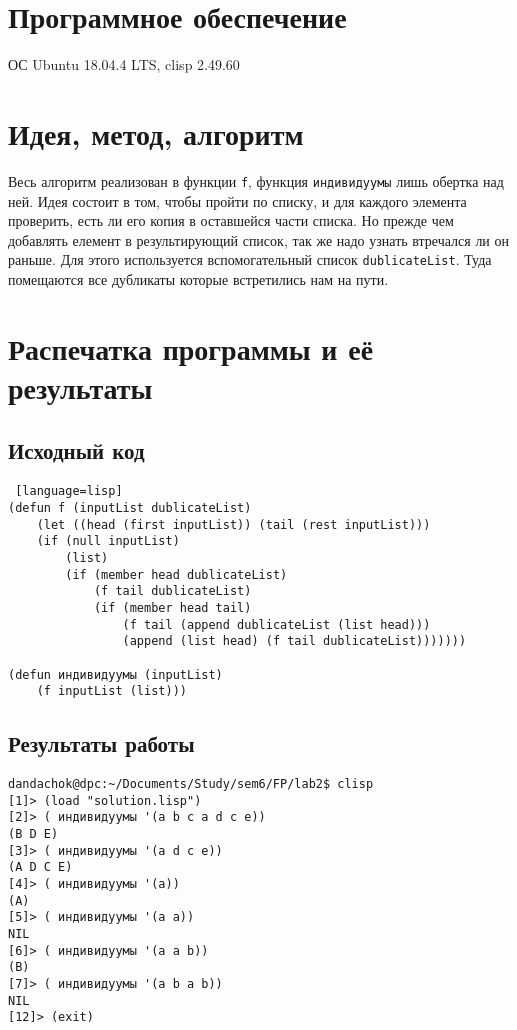 \documentclass[12pt]{article}
\begin{document}
\section{Программное обеспечение}
ОС Ubuntu 18.04.4 LTS, clisp 2.49.60

\pagebreak

\section{Идея, метод, алгоритм}
Весь алгоритм реализован в функции {\tt f}, функция {\tt индивидуумы} лишь обертка над ней.
Идея состоит в том, чтобы пройти по списку, и для каждого элемента проверить, есть ли его копия в оставшейся части списка. Но прежде чем добавлять елемент в результирующий список, так же надо узнать втречался ли он раньше. Для этого используется вспомогательный список {\tt dublicateList}.
Туда помещаются все дубликаты которые встретились нам на пути.

\section{Распечатка программы и её результаты}
\subsection{Исходный код}
\begin{lstlisting} [language=lisp]
(defun f (inputList dublicateList)
    (let ((head (first inputList)) (tail (rest inputList)))
    (if (null inputList)
        (list)
        (if (member head dublicateList)
            (f tail dublicateList)
            (if (member head tail)
                (f tail (append dublicateList (list head)))
                (append (list head) (f tail dublicateList)))))))

(defun индивидуумы (inputList)
    (f inputList (list)))
\end{lstlisting}

\subsection{Результаты работы}
\begin{lstlisting}
dandachok@dpc:~/Documents/Study/sem6/FP/lab2$ clisp
[1]> (load "solution.lisp")
[2]> ( индивидуумы '(a b c a d c e))
(B D E)
[3]> ( индивидуумы '(a d c e))
(A D C E)
[4]> ( индивидуумы '(a))
(A)
[5]> ( индивидуумы '(a a))
NIL
[6]> ( индивидуумы '(a a b))
(B)
[7]> ( индивидуумы '(a b a b))
NIL
[12]> (exit)
\end{lstlisting}
\end{document}
